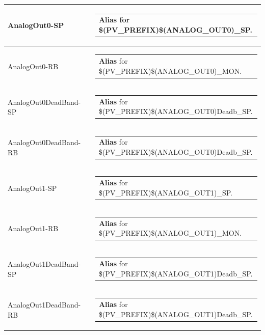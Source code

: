 \documentclass[openany]{article}
\begin{document}
\begin{longtable}{| m{4.5cm} m{2.5cm}  m{8.0cm} |}
        AnalogOut0-SP &  & \begin{tabular}{@{}m{6cm}@{}}
                \textbf{Alias} for \$(PV\_PREFIX)\$(ANALOG\_OUT0)\_SP.
            \end{tabular} \hypertarget{}{}\\ \hline
        AnalogOut0-RB &  & \begin{tabular}{@{}m{6cm}@{}}
                \textbf{Alias} for \$(PV\_PREFIX)\$(ANALOG\_OUT0)\_MON.
            \end{tabular} \hypertarget{}{}\\ \hline
        AnalogOut0DeadBand-SP &  & \begin{tabular}{@{}m{6cm}@{}}
                \textbf{Alias} for \$(PV\_PREFIX)\$(ANALOG\_OUT0)Deadb\_SP.
            \end{tabular} \hypertarget{}{}\\ \hline
        AnalogOut0DeadBand-RB &  & \begin{tabular}{@{}m{6cm}@{}}
                \textbf{Alias} for \$(PV\_PREFIX)\$(ANALOG\_OUT0)Deadb\_SP.
            \end{tabular} \hypertarget{}{}\\ \hline
        AnalogOut1-SP &  & \begin{tabular}{@{}m{6cm}@{}}
                \textbf{Alias} for \$(PV\_PREFIX)\$(ANALOG\_OUT1)\_SP.
            \end{tabular} \hypertarget{}{}\\ \hline
        AnalogOut1-RB &  & \begin{tabular}{@{}m{6cm}@{}}
                \textbf{Alias} for \$(PV\_PREFIX)\$(ANALOG\_OUT1)\_MON.
            \end{tabular} \hypertarget{}{}\\ \hline
        AnalogOut1DeadBand-SP &  & \begin{tabular}{@{}m{6cm}@{}}
                \textbf{Alias} for \$(PV\_PREFIX)\$(ANALOG\_OUT1)Deadb\_SP.
            \end{tabular} \hypertarget{}{}\\ \hline
        AnalogOut1DeadBand-RB &  & \begin{tabular}{@{}m{6cm}@{}}
                \textbf{Alias} for \$(PV\_PREFIX)\$(ANALOG\_OUT1)Deadb\_SP.
            \end{tabular} \hypertarget{}{}\\ \hline

\end{longtable}
\end{document}
